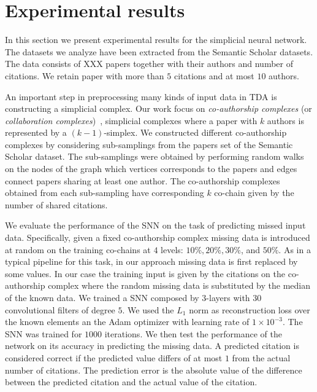\section{Experimental results}
In this section we present experimental results for the simplicial neural network. The datasets we analyze have been extracted from the Semantic Scholar datasets. The data consists of XXX papers together with their authors and number of citations. We retain paper with more than $5$ citations and at most $10$ authors.

An important step in preprocessing many kinds of input data in TDA is constructing a simplicial complex. Our work focus on \emph{co-authorship complexes} (or \emph{collaboration complexes})~\cite{patania2017}, simplicial complexes where a paper with $k$ authors is represented by a $(k-1)$-simplex. We constructed different co-authorship complexes by considering sub-samplings from the papers set of the Semantic Scholar dataset. The sub-samplings were obtained by performing random walks on the nodes of the graph which vertices corresponds to the papers and edges connect papers sharing at least one author. The co-authorship complexes obtained from each sub-sampling  have corresponding $k$ co-chain given by the number of shared citations.

We evaluate the performance of the SNN on the task of predicting missed input data. 
Specifically, given a fixed co-authorship complex missing data is introduced 
at random on the training co-chains at $4$ levels: $10\%,  20\%,  30\%$, and $50\% $.   As in a typical pipeline for this task, in our approach missing data is first replaced by some values. In our case the training input is given by the citations on the co-authorship complex where the random missing data is substituted by the median of the known data. We trained a SNN composed by $3$-layers with $30$ convolutional filters of degree $5$. We used the $L_1$ norm as reconstruction loss over the known elements an the Adam optimizer with learning rate of $1\times 10^{-3}$. The SNN was trained for $1000$ iterations. We then test the performance of the network on its accuracy in predicting the missing data. A predicted citation is considered correct if the predicted value differs of at most $1$ from the actual number of citations. The prediction error is the absolute value of the difference between the predicted citation and the actual value of the citation. 

